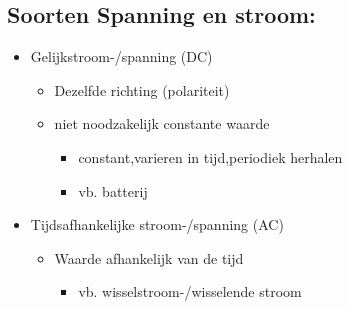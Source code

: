 \documentclass[12pt]{article}
\begin{document}
\subsection{Soorten Spanning en stroom:}
\begin{itemize}
    \item Gelijkstroom-/spanning (DC)\begin{itemize}
        \item Dezelfde richting (polariteit)
        \item niet noodzakelijk constante waarde\begin{itemize}
            \item constant,varieren in tijd,periodiek herhalen
            \item vb. batterij
        \end{itemize}
    \end{itemize}
    \item Tijdsafhankelijke stroom-/spanning (AC)\begin{itemize}
        \item Waarde afhankelijk van de tijd\begin{itemize}
            \item vb. wisselstroom-/wisselende stroom
        \end{itemize}
    \end{itemize}
\end{itemize}
\end{document}
